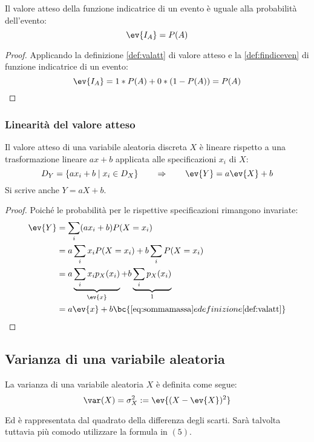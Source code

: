 \begin{prop} \label{prop:indvalatt}
	Il valore atteso della funzione indicatrice di un evento è uguale alla probabilità dell'evento:
	\begin{equation*}
		\ev{I_A}=P(A)
	\end{equation*}
\end{prop}
\begin{proof}
	Applicando la definizione \ref{def:valatt} di valore atteso e la \ref{def:findiceven} di funzione indicatrice di un evento:
	\begin{equation*}
		\ev{I_A}=1*P(A)+0*(1-P(A))=P(A)
	\end{equation*}
\end{proof}

\subsubsection{Linearità del valore atteso}
\begin{prop}
	Il valore atteso di una variabile aleatoria discreta $X$ è lineare rispetto a una trasformazione lineare $ax+b$ applicata alle specificazioni $x_i$ di $X$:
	\begin{equation*}
		D_Y = \{ax_i+b \mid x_i\in D_X\} \qquad\Rightarrow\qquad \ev{Y}=a\ev{X}+b
	\end{equation*}
	Si scrive anche $Y=aX+b$.
\end{prop}
\begin{proof}
	Poiché le probabilità per le rispettive specificazioni rimangono invariate:
	\begin{align*}
		\ev{Y} & = \sum_i (a x_i + b) P(X=x_i)                                                    \\
		       & = a\sum_i x_i P(X=x_i) + b\sum_i P(X=x_i)                                        \\
		       & = a\underbrace{\sum_i x_i p_X(x_i)}_{\ev{x}} + b\underbrace{\sum_i p_X(x_i)}_{1} \\
		       & = a \ev{x} + b \bc{\eqref{eq:sommamassa} e definizione \ref{def:valatt}}
	\end{align*}
\end{proof}



\subsection{Varianza di una variabile aleatoria}
\begin{defin} \label{def:var}
	La varianza di una variabile aleatoria $X$ è definita come segue:
	\begin{equation*}
		\var(X) = \sigma^2_X := \ev{(X-\ev{X})^2}
	\end{equation*}
\end{defin}
Ed è rappresentata dal quadrato della differenza degli scarti. Sarà talvolta tuttavia più comodo utilizzare la formula in $(5)$.



